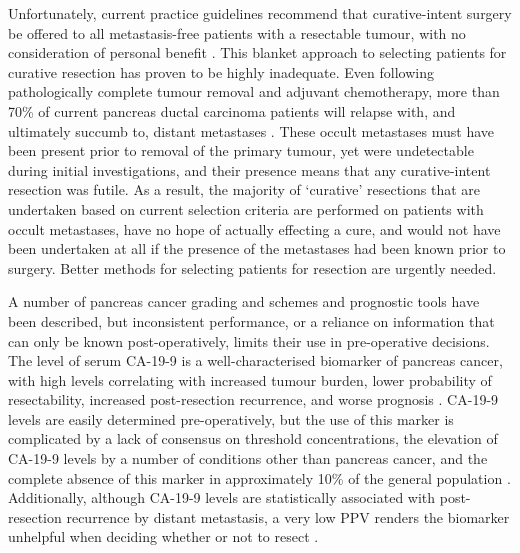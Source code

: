 \documentclass[dissertation.tex]{subfiles}
\begin{document}
Unfortunately, current practice guidelines recommend that curative-intent surgery be offered to all metastasis-free patients with a resectable tumour, with no consideration of personal benefit \cite{Editors2015}.  This blanket approach to selecting patients for curative resection has proven to be highly inadequate.  Even following pathologically complete tumour removal and adjuvant chemotherapy, more than 70\% of current pancreas ductal carcinoma patients will relapse with, and ultimately succumb to, distant metastases \cite{Barugola2007}.  These occult metastases must have been present prior to removal of the primary tumour, yet were undetectable during initial investigations, and their presence means that any curative-intent resection was futile.  As a result, the majority of `curative' resections that are undertaken based on current selection criteria are performed on patients with occult metastases, have no hope of actually effecting a cure, and would not have been undertaken at all if the presence of the metastases had been known prior to surgery.  Better methods for selecting patients for resection are urgently needed.

A number of pancreas cancer grading and schemes and prognostic tools have been described, but inconsistent performance, or a reliance on information that can only be known post-operatively, limits their use in pre-operative decisions.  The level of serum \gls{CA-19-9} is a well-characterised biomarker of pancreas cancer, with high levels correlating with increased tumour burden, lower probability of resectability, increased post-resection recurrence, and worse prognosis \cite{Kim2011, Ballehaninna2012, Barugola2007, Lundin1994}.  \Gls{CA-19-9} levels are easily determined pre-operatively, but the use of this marker is complicated by a lack of consensus on threshold concentrations, the elevation of \gls{CA-19-9} levels by a number of conditions other than pancreas cancer, and the complete absence of this marker in approximately 10\% of the general population \cite{Ballehaninna2012}.  Additionally, although \gls{CA-19-9} levels are statistically associated with post-resection recurrence by distant metastasis, a very low \gls{PPV} renders the biomarker unhelpful when deciding whether or not to resect \cite{Kim2011}.
\end{document}
